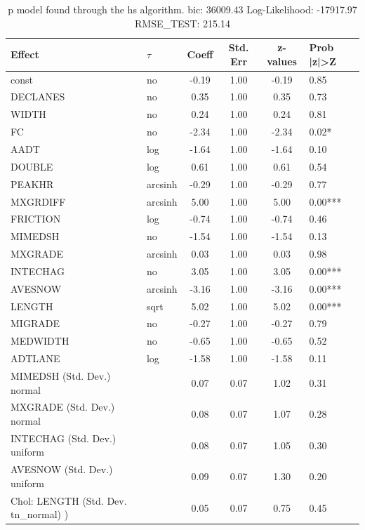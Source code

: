\begin{table}
	\caption{p model found through the hs algorithm. bic: 36009.43 Log-Likelihood: -17917.97 RMSE_TEST: 215.14}
	\begin{center}
		\begin{tabular}{|l|l|c|c|c|l|}
			\hline
			Effect & $\tau$ & Coeff & Std. Err & z-values & Prob |z|>Z \\
			\hline
			const & no & -0.19 & 1.00 & -0.19 & 0.85 \\
			\hline
			DECLANES & no & 0.35 & 1.00 & 0.35 & 0.73 \\
			\hline
			WIDTH & no & 0.24 & 1.00 & 0.24 & 0.81 \\
			\hline
			FC & no & -2.34 & 1.00 & -2.34 & 0.02* \\
			\hline
			AADT & log & -1.64 & 1.00 & -1.64 & 0.10 \\
			\hline
			DOUBLE & log & 0.61 & 1.00 & 0.61 & 0.54 \\
			\hline
			PEAKHR & arcsinh & -0.29 & 1.00 & -0.29 & 0.77 \\
			\hline
			MXGRDIFF & arcsinh & 5.00 & 1.00 & 5.00 & 0.00*** \\
			\hline
			FRICTION & log & -0.74 & 1.00 & -0.74 & 0.46 \\
			\hline
			MIMEDSH & no & -1.54 & 1.00 & -1.54 & 0.13 \\
			\hline
			MXGRADE & arcsinh & 0.03 & 1.00 & 0.03 & 0.98 \\
			\hline
			INTECHAG & no & 3.05 & 1.00 & 3.05 & 0.00*** \\
			\hline
			AVESNOW & arcsinh & -3.16 & 1.00 & -3.16 & 0.00*** \\
			\hline
			LENGTH & sqrt & 5.02 & 1.00 & 5.02 & 0.00*** \\
			\hline
			MIGRADE & no & -0.27 & 1.00 & -0.27 & 0.79 \\
			\hline
			MEDWIDTH & no & -0.65 & 1.00 & -0.65 & 0.52 \\
			\hline
			ADTLANE & log & -1.58 & 1.00 & -1.58 & 0.11 \\
			\hline
			MIMEDSH (Std. Dev.) normal &  & 0.07 & 0.07 & 1.02 & 0.31 \\
			\hline
			MXGRADE (Std. Dev.) normal &  & 0.08 & 0.07 & 1.07 & 0.28 \\
			\hline
			INTECHAG (Std. Dev.) uniform &  & 0.08 & 0.07 & 1.05 & 0.30 \\
			\hline
			AVESNOW (Std. Dev.) uniform &  & 0.09 & 0.07 & 1.30 & 0.20 \\
			\hline
			 Chol: LENGTH (Std. Dev. tn_normal) ) &  & 0.05 & 0.07 & 0.75 & 0.45 \\

\end{tabular}
\end{center}
\end{table}
